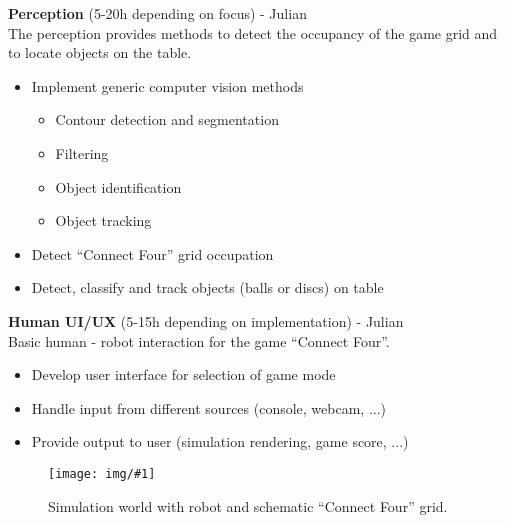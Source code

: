 \documentclass[11pt,pdftex,a4paper]{article}
\newcommand{\image}[1]{


\begin{center}
	\texttt{[image: img/\#1]}
\end{center}
}
\begin{document}
	\noindent
	\textbf{Perception} (5-20h depending on focus) - Julian\\
	The perception provides methods to detect the occupancy of the game grid and to locate objects on the table.
	\begin{itemize}
	\item Implement generic computer vision methods
		\begin{itemize}
		\item Contour detection and segmentation
		\item Filtering
		\item Object identification
		\item Object tracking	
		\end{itemize}
	\item Detect ``Connect Four'' grid occupation
	\item Detect, classify and track objects (balls or discs) on table
	\end{itemize}
	
	\noindent
	\textbf{Human UI/UX} (5-15h depending on implementation) - Julian\\
	Basic human - robot interaction for the game ``Connect Four''.
	\begin{itemize}
	\item Develop user interface for selection of game mode
	\item Handle input from different sources (console, webcam, ...)	
	\item Provide output to user (simulation rendering, game score, ...)
	\end{itemize}
	
	\begin{figure}[H]
	\image{Connect-4-concept}
	\caption{Simulation world with robot and schematic ``Connect Four'' grid.}
	\end{figure}
\end{document}
